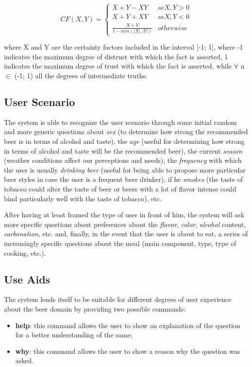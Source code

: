\documentclass[12pt]{article}
\begin{document}
\[
   CF(X,Y) =
   \begin{cases}
      X+Y-XY & se X,Y > 0 \\
      X+Y+XY & se X,Y < 0 \\
      \frac{X+Y}{1-min(|X|,|Y|)} & otherwise
   \end{cases}
\]

where X and Y are the certainty factors included in the interval [-1; 1], where -1 indicates the maximum degree of distrust with which the fact is asserted, 1 indicates the maximum degree of trust with which the fact is asserted, while $\forall$ n $\in$ (-1; 1) all the degrees of intermediate truths.

\subsection{User Scenario}
The system is able to recognize the user scenario through some initial random and more generic questions about \textit{sex} (to determine how strong the recommended beer is in terms of alcohol and taste), the \textit{age} (useful for determining how strong in terms of alcohol and taste will be the recommended beer), the current \textit{season} (weather conditions affect our perceptions and needs), the \textit{frequency} with which the user is usually \textit{drinking beer} (useful for being able to propose more particular beer styles in case the user is a frequent beer drinker), if he \textit{smokes} (the taste of tobacco could alter the taste of beer or beers with a lot of flavor intense could bind particularly well with the taste of tobacco), etc.

After having at least framed the type of user in front of him, the system will ask more specific questions about preferences about the \textit{flavor}, \textit{color}, \textit{alcohol} content, \textit{carbonation}, etc. and, finally, in the event that the user is about to eat, a series of increasingly specific questions about the meal (main component, type, type of cooking, etc.).

\subsection{Use Aids}
The system lends itself to be suitable for different degrees of user experience about the beer domain by providing two possible commands:
\begin{itemize}
\item \textbf{help}: this command allows the user to show an explanation of the question for a better understanding of the same;
\item \textbf{why}: this command allows the user to show a reason why the question was asked.
\end{itemize}
\end{document}
